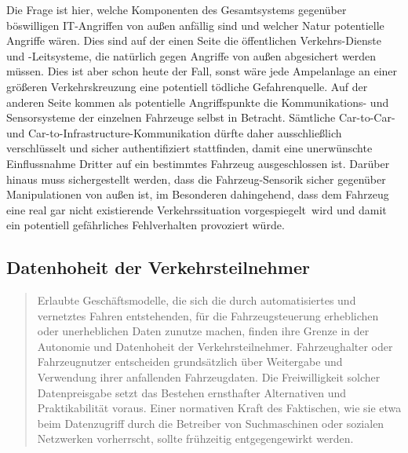 \documentclass[twoside,a4paper,12pt]{article}
\begin{document}
Die Frage ist hier, welche Komponenten des Gesamtsystems  gegenüber böswilligen IT-Angriffen von außen anfällig sind und welcher Natur potentielle Angriffe
wären. Dies sind auf der einen Seite die öffentlichen Verkehrs-Dienste und -Leitsysteme, die natürlich gegen Angriffe von außen abgesichert werden müssen. 
Dies ist aber schon heute der Fall, sonst wäre jede Ampelanlage an einer größeren Verkehrskreuzung eine potentiell tödliche Gefahrenquelle. Auf der anderen Seite kommen als potentielle Angriffspunkte die Kommunikations- und Sensorsysteme der einzelnen Fahrzeuge selbst in Betracht. Sämtliche Car-to-Car- und Car-to-Infrastructure-Kommunikation dürfte daher ausschließlich verschlüsselt und sicher authentifiziert stattfinden, damit eine unerwünschte Einflussnahme Dritter auf ein bestimmtes Fahrzeug ausgeschlossen ist. Darüber hinaus muss sichergestellt werden, dass die Fahrzeug-Sensorik sicher gegenüber Manipulationen von außen ist, 
im Besonderen dahingehend, dass dem Fahrzeug eine real gar nicht existierende Verkehrssituation \glqq vorgespiegelt\grqq\ wird und damit ein potentiell 
gefährliches Fehlverhalten provoziert würde.\\

\subsection{Datenhoheit der Verkehrsteilnehmer} \label{DatenhoheitDerVerkehrsteilnehmer}

\begin{quote}
\glqq
Erlaubte Geschäftsmodelle, die sich die durch automatisiertes und vernetztes Fahren entstehenden, für die Fahrzeugsteuerung 
erheblichen oder unerheblichen Daten zunutze
machen, finden ihre Grenze in der Autonomie und Datenhoheit der Verkehrsteilnehmer.
Fahrzeughalter oder Fahrzeugnutzer entscheiden grundsätzlich über Weitergabe und
Verwendung ihrer anfallenden Fahrzeugdaten. Die Freiwilligkeit solcher Datenpreisgabe
setzt das Bestehen ernsthafter Alternativen und Praktikabilität voraus. Einer normativen
Kraft des Faktischen, wie sie etwa beim Datenzugriff durch die Betreiber von Suchmaschinen oder sozialen Netzwerken vorherrscht, 
sollte frühzeitig entgegengewirkt werden.\grqq\mbox{~\cite[S. 12]{ek}}
\end{quote}
\end{document}
